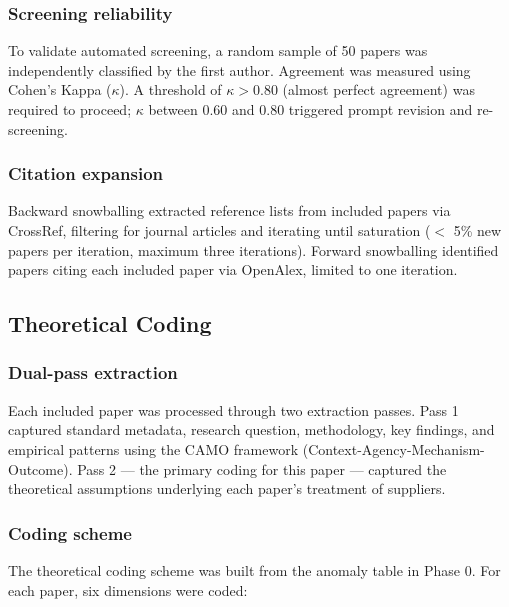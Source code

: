 \subsubsection{Screening reliability}

To validate automated screening, a random sample of 50 papers was independently classified by the first author. Agreement was measured using Cohen's Kappa ($\kappa$). A threshold of $\kappa > 0.80$ (almost perfect agreement) was required to proceed; $\kappa$ between 0.60 and 0.80 triggered prompt revision and re-screening.

\subsubsection{Citation expansion}

Backward snowballing extracted reference lists from included papers via CrossRef, filtering for journal articles and iterating until saturation ($<$ 5\% new papers per iteration, maximum three iterations). Forward snowballing identified papers citing each included paper via OpenAlex, limited to one iteration.

\subsection{Theoretical Coding}

\subsubsection{Dual-pass extraction}

Each included paper was processed through two extraction passes. Pass 1 captured standard metadata, research question, methodology, key findings, and empirical patterns using the CAMO framework (Context-Agency-Mechanism-Outcome). Pass 2 --- the primary coding for this paper --- captured the theoretical assumptions underlying each paper's treatment of suppliers.

\subsubsection{Coding scheme}

The theoretical coding scheme was built from the anomaly table in Phase 0. For each paper, six dimensions were coded:

